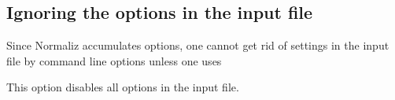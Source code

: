 \subsection{Ignoring the options in the input file}

Since Normaliz accumulates options, one cannot get rid of settings in the input file by command line options unless one uses
\begin{itemize}
	\itemtt[-{}-ignore, -i] This option disables all options in the input file.
\end{itemize}

\endinput 

\subsubsection{Subdivision of simplicial cones}

Subdivision requires enlarging the set of generators and can lead to a nested triangulation (see Sections~\ref{subdiv} and~\ref{nested}). The subdivision can be blocked by
\begin{itemize}
	\itemtt[NoSubdivision]
\end{itemize}
